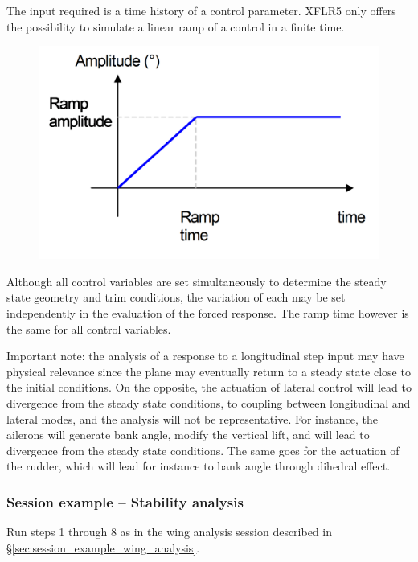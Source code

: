 \documentclass[a4paper,twoside,12pt,dvips]{article}
\begin{document}
The input required is a time history of a control parameter. XFLR5
only offers the possibility to simulate a linear ramp of a control in
a finite time.

\begin{figure}[htbp]
  \includegraphics[width=0.8\linewidth]{img-49}\centering 
  \caption{}
  \label{fig:}
\end{figure}

Although all control variables are set simultaneously to determine the
steady state geometry and trim conditions, the variation of each may
be set independently in the evaluation of the forced response. The
ramp time however is the same for all control variables.

Important note: the analysis of a response to a longitudinal step
input may have physical relevance since the plane may eventually
return to a steady state close to the initial conditions. On the
opposite, the actuation of lateral control will lead to divergence
from the steady state conditions, to coupling between longitudinal and
lateral modes, and the analysis will not be representative. For
instance, the ailerons will generate bank angle, modify the vertical
lift, and will lead to divergence from the steady state
conditions. The same goes for the actuation of the rudder, which will
lead for instance to bank angle through dihedral effect.

\subsubsection{Session example -- Stability analysis}

Run steps 1 through 8 as in the wing analysis session described in
\S\ref{sec:session_example_wing_analysis}.
\end{document}
